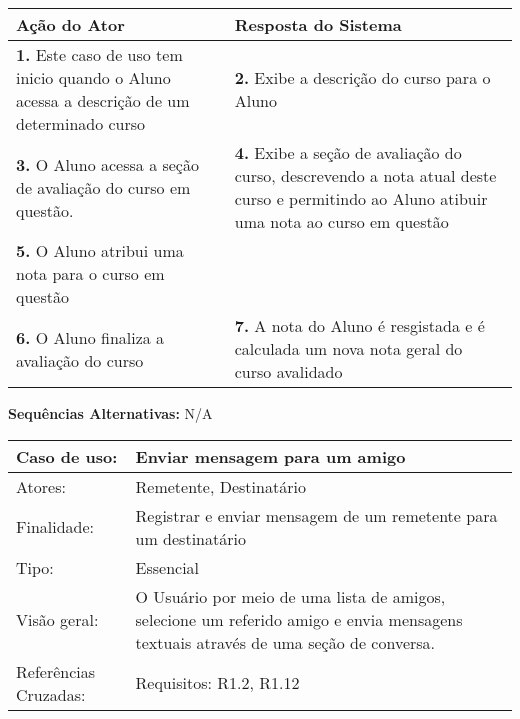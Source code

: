 \documentclass[12pt,a4paper,onecolumn,titlepage]{article}
\begin{document}
\begin{center}
\def\arraystretch{1.1}
\begin{tabular}{|p{6cm}|p{6cm}|}

\hline
\textbf{Ação do Ator} & \textbf{Resposta do Sistema} \\ \hline
\textbf{1.} Este caso de uso tem inicio quando o Aluno acessa a descrição de um determinado curso  & \textbf{2.} Exibe a descrição do curso para o Aluno  \\ \hline
\textbf{3.} O Aluno acessa a seção de avaliação do curso em questão.  & \textbf{4.} Exibe a seção de avaliação do curso, descrevendo a nota atual deste curso e permitindo ao Aluno atibuir uma nota ao curso em questão  \\ \hline
\textbf{5.} O Aluno atribui uma nota para o curso em questão  &   \\ \hline
\textbf{6.} O Aluno finaliza a avaliação do curso  & \textbf{7.} A nota do Aluno é resgistada e é calculada um nova nota geral do curso avalidado \\ \hline
\end{tabular}
\end{center}

\textbf{Sequências Alternativas:} N/A


\newpage

\begin{table}[h!]
\begin{center}
\begin{tabular}{p{2.5cm} p{9.5cm}}
Caso de uso: & \textbf{Enviar mensagem para um amigo} \\ \hline
Atores: & Remetente, Destinatário \\ \hline
Finalidade: & Registrar e enviar mensagem de um remetente para um destinatário\\ \hline
Tipo: & Essencial \\ \hline
Visão geral: & O Usuário por meio de uma lista de amigos, selecione um referido amigo e envia mensagens textuais através de uma seção de conversa. \\ \hline
Referências Cruzadas: & Requisitos: R1.2, R1.12\\

\end{tabular}
\end{center}
\end{table} 
\end{document}
